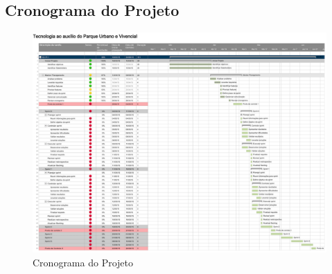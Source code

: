 \begin{anexosenv}

\partanexos

\chapter{Cronograma do Projeto}

\begin{figure}[h]
       \centering
	\label{Cronograma do Projeto}
		\includegraphics[keepaspectratio=true,scale=0.8,angle=270]{figuras/CronogramaProjeto.png}
	\caption{Cronograma do Projeto}
\end{figure}

\end{anexosenv}